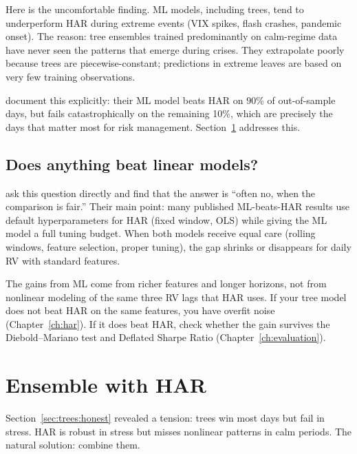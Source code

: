 Here is the uncomfortable finding.  ML models, including trees, tend to
underperform HAR during extreme events (VIX spikes, flash crashes, pandemic
onset).  The reason: tree ensembles trained predominantly on calm-regime
data have never seen the patterns that emerge during crises.  They
extrapolate poorly because trees are piecewise-constant; predictions in
extreme leaves are based on very few training observations.

\citet{RahimikiaPoon2020} document this explicitly: their ML model beats HAR
on 90\% of out-of-sample days, but fails catastrophically on the remaining
10\%, which are precisely the days that matter most for risk management.
Section~\ref{sec:trees:ensemble} addresses this.

\subsection*{Does anything beat linear models?}

\citet{BrancoRubesamZevallos2024} ask this question directly and find that
the answer is ``often no, when the comparison is fair.''  Their main point:
many published ML-beats-HAR results use default hyperparameters for HAR
(fixed window, OLS) while giving the ML model a full tuning budget.  When
both models receive equal care (rolling windows, feature selection, proper
tuning), the gap shrinks or disappears for daily RV with standard features.

\begin{keyidea}
The gains from ML come from richer features and longer horizons, not from
nonlinear modeling of the same three RV lags that HAR uses.  If your tree
model does not beat HAR on the same features, you have overfit noise
(Chapter~\ref{ch:har}).  If it does beat HAR, check whether the gain
survives the Diebold--Mariano test and Deflated Sharpe Ratio
(Chapter~\ref{ch:evaluation}).
\end{keyidea}


\section{Ensemble with HAR}\label{sec:trees:ensemble}

Section~\ref{sec:trees:honest} revealed a tension: trees win most days but
fail in stress.  HAR is robust in stress but misses nonlinear patterns in
calm periods.  The natural solution: combine them.

